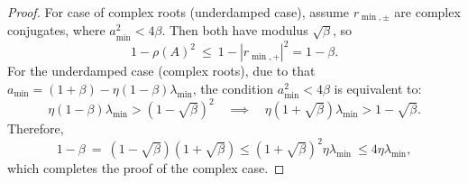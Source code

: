 \documentclass[10pt,a4paper]{amsart}
\begin{document}
\begin{proof}
For case of complex roots (underdamped case),
assume $r_{\min,\pm}$ are complex conjugates, where $a_{\min}^2<4\beta$.
Then both have modulus
$\sqrt{\beta}$, so
\[
1 - \rho(A)^2
\ \le\ 1 - |r_{\min,+}|^2
= 1 - \beta.
\]
For the underdamped case (complex roots), due to that
$a_{\min}=(1+\beta)-\eta(1-\beta)\lambda_{\min}$, the condition
$a_{\min}^2<4\beta$ is equivalent to:
\[
  \eta(1-\beta)\lambda_{\min}  > (1-\sqrt{\beta})^2
\quad  \implies \quad
\eta(1+\sqrt{\beta})\lambda_{\min}  > 1-\sqrt{\beta}.
\]
Therefore,
\[
1-\beta \ =\ (1-\sqrt{\beta})(1+\sqrt{\beta})
\leq (1+\sqrt{\beta})^2\eta\lambda_{\min} \ \leq 4\eta\lambda_{\min},
\]
which completes the proof of the complex case.
\end{proof}
\end{document}
